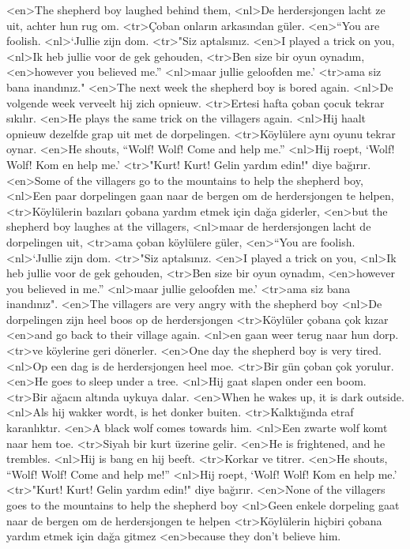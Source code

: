 <en>The shepherd boy laughed behind them,
<nl>De herdersjongen lacht ze uit, achter hun rug om. 
<tr>Çoban onların arkasından güler.
<en>“You are foolish.
<nl>`Jullie zijn dom.
<tr>"Siz aptalsınız.
<en>I played a trick on you,
<nl>Ik heb jullie voor de gek gehouden,
<tr>Ben size bir oyun oynadım,
<en>however you believed me.”
<nl>maar jullie geloofden me.'
<tr>ama siz bana inandınız."
<en>The next week the shepherd boy is bored again.
<nl>De volgende week verveelt hij zich opnieuw.
<tr>Ertesi hafta çoban çocuk tekrar sıkılır.
<en>He plays the same trick on the villagers again.
<nl>Hij haalt opnieuw dezelfde grap uit met de dorpelingen.
<tr>Köylülere aynı oyunu tekrar oynar.
<en>He shouts, “Wolf! Wolf! Come and help me.”
<nl>Hij roept, `Wolf! Wolf! Kom en help me.'
<tr>"Kurt! Kurt! Gelin yardım edin!" diye bağırır.
<en>Some of the villagers go to the mountains to help the shepherd boy,
<nl>Een paar dorpelingen gaan naar de bergen om de herdersjongen te helpen,
<tr>Köylülerin bazıları çobana yardım etmek için dağa giderler,
<en>but the shepherd boy laughes at the villagers,
<nl>maar de herdersjongen lacht de dorpelingen uit,
<tr>ama çoban köylülere güler,
<en>“You are foolish.
<nl>`Jullie zijn dom. 
<tr>"Siz aptalsınız.
<en>I played a trick on you,
<nl>Ik heb jullie voor de gek gehouden,
<tr>Ben size bir oyun oynadım,
<en>however you believed in me.”
<nl>maar jullie geloofden me.'
<tr>ama siz bana inandınız".
<en>The villagers are very angry with the shepherd boy
<nl>De dorpelingen zijn heel boos op de herdersjongen
<tr>Köylüler çobana çok kızar
<en>and go back to their village again.
<nl>en gaan weer terug naar hun dorp.
<tr>ve köylerine geri dönerler.
<en>One day the shepherd boy is very tired.
<nl>Op een dag is de herdersjongen heel moe.
<tr>Bir gün çoban çok yorulur.
<en>He goes to sleep under a tree.
<nl>Hij gaat slapen onder een boom.
<tr>Bir ağacın altında uykuya dalar.
<en>When he wakes up, it is dark outside.
<nl>Als hij wakker wordt, is het donker buiten.
<tr>Kalktığında etraf karanlıktır.
<en>A black wolf comes towards him.
<nl>Een zwarte wolf komt naar hem toe.
<tr>Siyah bir kurt üzerine gelir.
<en>He is frightened, and he trembles.
<nl>Hij is bang en hij beeft.
<tr>Korkar ve titrer.
<en>He shouts, “Wolf! Wolf! Come and help me!”
<nl>Hij roept, `Wolf! Wolf! Kom en help me.'
<tr>"Kurt! Kurt! Gelin yardım edin!" diye bağırır.
<en>None of the villagers goes to the mountains to help the shepherd boy
<nl>Geen enkele dorpeling gaat naar de bergen om de herdersjongen te helpen
<tr>Köylülerin hiçbiri çobana yardım etmek için dağa gitmez
<en>because they don’t believe him.
